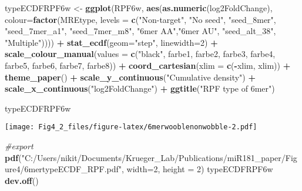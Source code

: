 \documentclass[
]{article}
\newenvironment{Shaded}{\begin{snugshade}}{\end{snugshade}}
\newcommand{\AttributeTok}[1]{\textcolor[rgb]{0.13,0.29,0.53}{#1}}
\newcommand{\CommentTok}[1]{\textcolor[rgb]{0.56,0.35,0.01}{\textit{#1}}}
\newcommand{\DecValTok}[1]{\textcolor[rgb]{0.00,0.00,0.81}{#1}}
\newcommand{\FunctionTok}[1]{\textcolor[rgb]{0.13,0.29,0.53}{\textbf{#1}}}
\newcommand{\NormalTok}[1]{#1}
\newcommand{\OtherTok}[1]{\textcolor[rgb]{0.56,0.35,0.01}{#1}}
\newcommand{\SpecialCharTok}[1]{\textcolor[rgb]{0.81,0.36,0.00}{\textbf{#1}}}
\newcommand{\StringTok}[1]{\textcolor[rgb]{0.31,0.60,0.02}{#1}}
\begin{document}
\begin{Shaded}
\begin{Highlighting}[]
\NormalTok{typeECDFRPF6w }\OtherTok{\textless{}{-}} \FunctionTok{ggplot}\NormalTok{(RPF6w, }\FunctionTok{aes}\NormalTok{(}\FunctionTok{as.numeric}\NormalTok{(log2FoldChange), }
                              \AttributeTok{colour=}\FunctionTok{factor}\NormalTok{(MREtype, }\AttributeTok{levels =} \FunctionTok{c}\NormalTok{(}\StringTok{"Non{-}target"}\NormalTok{, }\StringTok{"No seed"}\NormalTok{, }\StringTok{"seed\_8mer"}\NormalTok{, }\StringTok{"seed\_7mer\_a1"}\NormalTok{, }\StringTok{"seed\_7mer\_m8"}\NormalTok{, }\StringTok{"6mer AA"}\NormalTok{,}\StringTok{"6mer AU"}\NormalTok{, }\StringTok{"seed\_alt\_38"}\NormalTok{, }\StringTok{"Multiple"}\NormalTok{)))) }\SpecialCharTok{+} 
  \FunctionTok{stat\_ecdf}\NormalTok{(}\AttributeTok{geom=}\StringTok{"step"}\NormalTok{, }\AttributeTok{linewidth=}\DecValTok{2}\NormalTok{) }\SpecialCharTok{+}
  \FunctionTok{scale\_colour\_manual}\NormalTok{(}\AttributeTok{values =} \FunctionTok{c}\NormalTok{(}\StringTok{"black"}\NormalTok{, farbe1, farbe2, farbe3, farbe4, farbe5, farbe6, farbe7, farbe8)) }\SpecialCharTok{+}
  \FunctionTok{coord\_cartesian}\NormalTok{(}\AttributeTok{xlim =} \FunctionTok{c}\NormalTok{(}\SpecialCharTok{{-}}\NormalTok{xlim, xlim)) }\SpecialCharTok{+} 
  \FunctionTok{theme\_paper}\NormalTok{() }\SpecialCharTok{+}
  \FunctionTok{scale\_y\_continuous}\NormalTok{(}\StringTok{"Cumulative density"}\NormalTok{) }\SpecialCharTok{+} \FunctionTok{scale\_x\_continuous}\NormalTok{(}\StringTok{"log2FoldChange"}\NormalTok{) }\SpecialCharTok{+}
  \FunctionTok{ggtitle}\NormalTok{(}\StringTok{"RPF type of 6mer"}\NormalTok{)}

\NormalTok{typeECDFRPF6w}
\end{Highlighting}
\end{Shaded}

\texttt{[image: Fig4\_2\_files/figure-latex/6merwooblenonwobble-2.pdf]}

\begin{Shaded}
\begin{Highlighting}[]
\CommentTok{\#export}
\FunctionTok{pdf}\NormalTok{(}\StringTok{"C:/Users/nikit/Documents/Krueger\_Lab/Publications/miR181\_paper/Figure4/6mertypeECDF\_RPF.pdf"}\NormalTok{, }\AttributeTok{width=}\DecValTok{2}\NormalTok{, }\AttributeTok{height =} \DecValTok{2}\NormalTok{)}
\NormalTok{typeECDFRPF6w}
\FunctionTok{dev.off}\NormalTok{()}
\end{Highlighting}
\end{Shaded}
\end{document}
